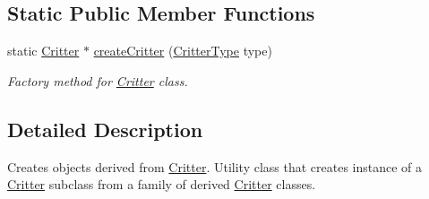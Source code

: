 \subsection*{Static Public Member Functions}
\begin{DoxyCompactItemize}
\item 
static \hyperlink{class_critter}{Critter} $\ast$ \hyperlink{class_critter_factory_a983fedc85e591f4b9fdebcf2b73853c8}{create\+Critter} (\hyperlink{class_critter_factory_a865a154e14b99d3dbf4d329a49210f6a}{Critter\+Type} type)
\begin{DoxyCompactList}\small\item\em Factory method for \hyperlink{class_critter}{Critter} class. \end{DoxyCompactList}\end{DoxyCompactItemize}


\subsection{Detailed Description}
Creates objects derived from \hyperlink{class_critter}{Critter}. Utility class that creates instance of a \hyperlink{class_critter}{Critter} subclass from a family of derived \hyperlink{class_critter}{Critter} classes. 

